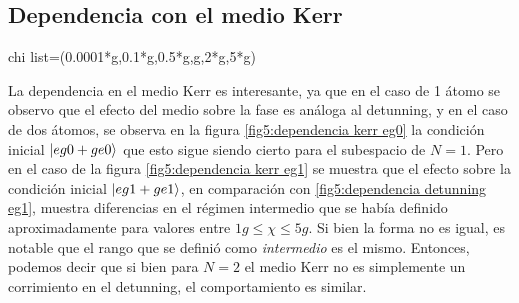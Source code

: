 \subsection{Dependencia con el medio Kerr}
chi list=(0.0001*g,0.1*g,0.5*g,g,2*g,5*g)

La dependencia en el medio Kerr es interesante, ya que en el caso de 1 átomo se observo que el efecto del medio sobre la fase es análoga al detunning, y en el caso de dos átomos, se observa en la figura \ref{fig5:dependencia kerr eg0} la condición inicial $\ket{eg0+ge0}$ que esto sigue siendo cierto para el subespacio de $N=1$. Pero en el caso de la figura \ref{fig5:dependencia kerr eg1} se muestra que el efecto sobre la condición inicial $\ket{eg1+ge1}$, en comparación con \ref{fig5:dependencia detunning eg1}, muestra diferencias en el régimen intermedio que se había definido aproximadamente para valores entre $1g \leq \chi \leq 5g$. Si bien la forma no es igual, es notable que el rango que se definió como \textit{intermedio} es el mismo. Entonces, podemos decir que si bien para $N=2$ el medio Kerr no es simplemente un corrimiento en el detunning, el comportamiento es similar. 

